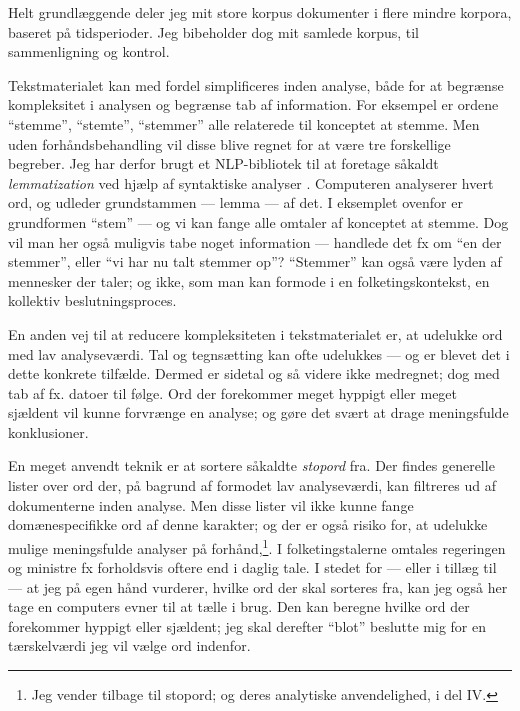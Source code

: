 Helt grundlæggende deler jeg mit store korpus dokumenter i flere mindre korpora, baseret på tidsperioder.
Jeg bibeholder dog mit samlede korpus, til sammenligning og kontrol.

Tekstmaterialet kan med fordel simplificeres inden analyse, både for at begrænse kompleksitet i analysen og begrænse tab af information.
For eksempel er ordene “stemme”, “stemte”, “stemmer” alle relaterede til konceptet at stemme.
Men uden forhåndsbehandling vil disse blive regnet for at være tre forskellige begreber.
Jeg har derfor brugt et NLP-bibliotek \autocite{strakaUDPipeUFAL2020} til at foretage såkaldt \textit{lemmatization} ved hjælp af syntaktiske analyser \autocite[s. 28]{kwartlerTextMiningPractice2017}.
Computeren analyserer hvert ord, og udleder grundstammen --- lemma — af det. I eksemplet ovenfor er grundformen “stem” — og vi kan fange alle omtaler af konceptet at stemme.
Dog vil man her også muligvis tabe noget information — handlede det fx om “en der stemmer”, eller “vi har nu talt stemmer op”?
“Stemmer” kan også være lyden af mennesker der taler; og ikke, som man kan formode i en folketingskontekst, en kollektiv beslutningsproces.

En anden vej til at reducere kompleksiteten i tekstmaterialet er, at udelukke ord med lav analyseværdi.
Tal og tegnsætting kan ofte udelukkes — og er blevet det i dette konkrete tilfælde.
Dermed er sidetal og så videre ikke medregnet; dog med tab af fx. datoer til følge.
Ord der forekommer meget hyppigt eller meget sjældent vil kunne forvrænge en analyse; og gøre det svært at drage meningsfulde konklusioner.

En meget anvendt teknik er at sortere såkaldte \textit{stopord} fra.
Der findes generelle lister over ord der, på bagrund af formodet lav analyseværdi, kan filtreres ud af dokumenterne inden analyse.
Men disse lister vil ikke kunne fange domænespecifikke ord af denne karakter; og der er også risiko for, at udelukke mulige meningsfulde analyser på forhånd,\autocite[s. 27]{manningIntroductionInformationRetrieval2008}\footnote{Jeg vender tilbage til stopord;
og deres analytiske anvendelighed, i del IV.}.
I folketingstalerne omtales regeringen og ministre fx forholdsvis oftere end i daglig tale.
I stedet for — eller i tillæg til — at jeg på egen hånd vurderer, hvilke ord der skal sorteres fra, kan jeg også her tage en computers evner til at tælle i brug.
Den kan beregne hvilke ord der forekommer hyppigt eller sjældent; jeg skal derefter “blot” beslutte mig for en tærskelværdi jeg vil vælge ord indenfor.

